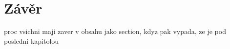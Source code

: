 \documentclass{template/socthesis}
\begin{document}
\begin{enumerate}
\end{enumerate}

\newpage
\chapter*{Závěr}
proc vsichni maji zaver v obsahu jako section, kdyz pak vypada, ze je pod posledni kapitolou

\newpage
\printbibliography[title=Literatura]

\listoffigures
{}

\listoftables
{}
%
\end{document}
